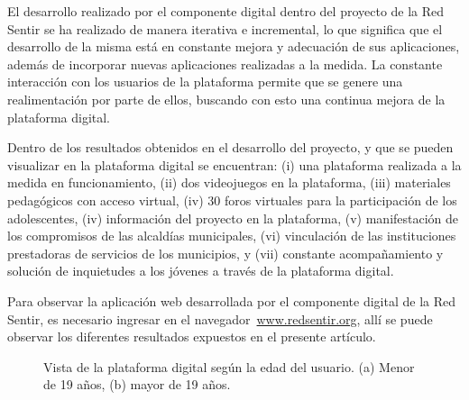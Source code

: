 \documentclass[a4paper]{article}
\begin{document}
El desarrollo realizado por el componente digital dentro del proyecto de la Red Sentir se ha realizado de manera iterativa e incremental, lo que significa que el desarrollo de la misma está en constante mejora y adecuación de sus aplicaciones, además de incorporar nuevas aplicaciones realizadas a la medida. La constante interacción con los usuarios de la plataforma permite que se genere una realimentación por parte de ellos, buscando con esto una continua mejora de la plataforma digital.

Dentro de los resultados obtenidos en el desarrollo del proyecto, y que se pueden visualizar en la plataforma digital se encuentran: (i) una plataforma realizada a la medida en funcionamiento, (ii) dos videojuegos en la plataforma, (iii) materiales pedagógicos con acceso virtual, (iv) $30$ foros virtuales para la participación de los adolescentes, (iv) información del proyecto en la plataforma, (v) manifestación de los compromisos de las alcaldías municipales, (vi) vinculación de las instituciones prestadoras de servicios de los municipios, y (vii) constante acompañamiento y solución de inquietudes a los jóvenes a través de la plataforma digital.

Para observar la aplicación web desarrollada por el componente digital de la Red Sentir, es necesario ingresar en el navegador~\url{www.redsentir.org}, allí se puede observar los diferentes resultados expuestos en el presente artículo.

\begin{figure}[tbp]
  \centering
	  \hspace{1mm}
  \caption{Vista de la plataforma digital según la edad del usuario. (a) Menor de 19 años, (b) mayor de 19 años.}
  \label{fig:vista_plataforma}
\end{figure}
\end{document}
